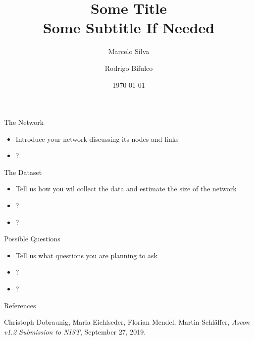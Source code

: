 \documentclass[aspectratio=169]{beamer}
\title{Some Title \\
    Some Subtitle If Needed}
\author{Marcelo Silva \and Rodrigo Bifulco}
\date{\today}
\begin{document}
\begin{frame}
\titlepage
\end{frame}

\begin{frame}{The Network}
\begin{itemize}
    \item Introduce your network discussing its nodes and links
    \item ?
\end{itemize}
\end{frame}

\begin{frame}{The Dataset}
\begin{itemize}
    \item Tell us how you wil collect the data and estimate the size of the
network
    \item ?
    \item ?
\end{itemize}
\end{frame}

\begin{frame}{Possible Questions}
\begin{itemize}
    \item Tell us what questions you are planning to ask
    \item ?
    \item ?
\end{itemize}
\end{frame}

\begin{frame}{References}


\begin{thebibliography}{2}

 Christoph Dobraunig, Maria Eichlseder, Florian Mendel,
Martin Schläffer, {\em Ascon v1.2 Submission to NIST}, September 27, 2019.

\end{thebibliography}
\end{frame}
\end{document}
